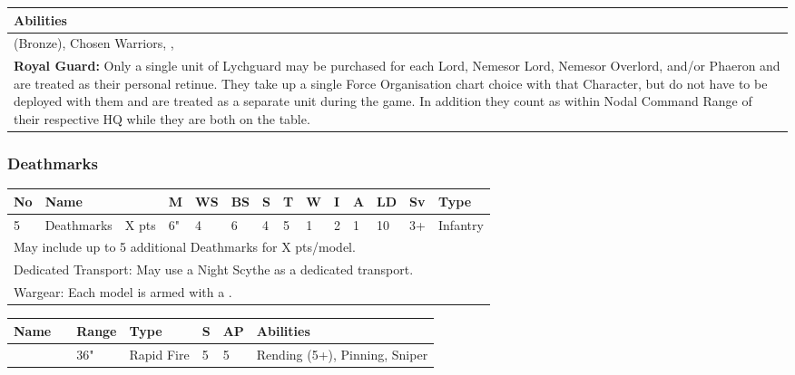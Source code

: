 \noindent
\begin{tabular}{||m{532pt}||}
	\hline
	Abilities \\
	\hline
	\quickref{Awakening Protocols} (Bronze), Chosen Warriors, \quickref{Living Metal}, \quickref{Reanimation Protocols} \\
	\textbf{Royal Guard:} Only a single unit of Lychguard may be purchased for each Lord, Nemesor Lord, Nemesor Overlord, and/or Phaeron and are treated as their personal retinue. They take up a single Force Organisation chart choice with that Character, but do not have to be deployed with them and are treated as a separate unit during the game. In addition they count as within Nodal Command Range of their respective HQ while they are both on the table. \\
	\hline
\end{tabular}

\newpage
\subsubsection{Deathmarks}

\noindent
\begin{tabular}{||m{10pt} m{95pt} m{30pt} m{11pt} m{11pt} m{11pt} m{11pt} m{11pt} m{11pt} m{11pt} m{11pt} m{11pt} m{11pt} m{125pt}||}
	\hline
	No & Name & & M & WS & BS & S & T & W & I & A & LD & Sv & Type \\
	\hline
	5 & Deathmarks & X pts & 6" & 4 & 6 & 4 & 5 & 1 & 2 & 1 & 10 & 3+ & Infantry \\
	\hline
	\hline
	\multicolumn{14}{||Z{532 pt}||}{May include up to 5 additional Deathmarks for X pts/model.}\\	
	\multicolumn{14}{||Z{532 pt}||}{Dedicated Transport: May use a Night Scythe as a dedicated transport.}\\
	\hline
	\hline
	\multicolumn{14}{||Z{532 pt}||}{Wargear: Each model is armed with a \quickref{Synaptic Disnitegrator}.} \\
	\hline
\end{tabular}

\noindent
\begin{tabular}{||m{140pt} m{00pt} m{31pt} m{55pt} m{12pt} m{12pt} m{210pt}||}
	\hline
	Name & & Range & Type & S & AP & Abilities \\
	\hline
	\quickref{Synaptic Disintegrator} &  & 36" & Rapid Fire & 5 & 5 & Rending (5+), Pinning, Sniper \\
	\hline
\end{tabular}

